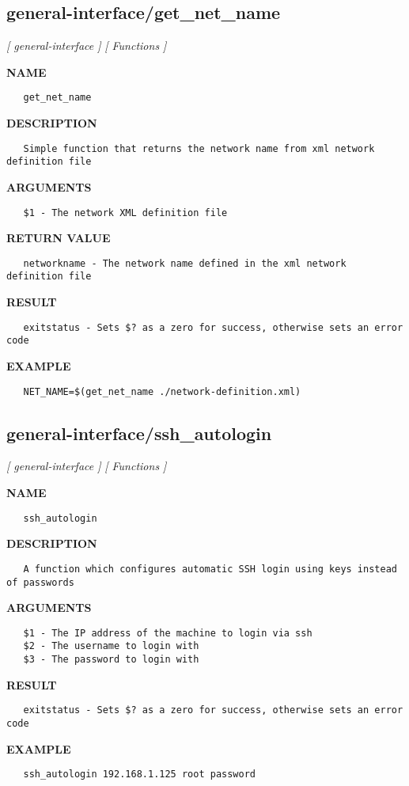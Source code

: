 \subsection{general-interface/get\_net\_name}
\textsl{[ general-interface ]}
\textsl{[ Functions ]}

\label{ch:robo26}
\label{ch:general_interface_get_net_name}
\textbf{NAME}
\begin{verbatim}
   get_net_name
\end{verbatim}
\textbf{DESCRIPTION}
\begin{verbatim}
   Simple function that returns the network name from xml network definition file
\end{verbatim}
\textbf{ARGUMENTS}
\begin{verbatim}
   $1 - The network XML definition file
\end{verbatim}
\textbf{RETURN VALUE}
\begin{verbatim}
   networkname - The network name defined in the xml network definition file
\end{verbatim}
\textbf{RESULT}
\begin{verbatim}
   exitstatus - Sets $? as a zero for success, otherwise sets an error code
\end{verbatim}
\textbf{EXAMPLE}
\begin{verbatim}
   NET_NAME=$(get_net_name ./network-definition.xml)
\end{verbatim}
\newpage
\subsection{general-interface/ssh\_autologin}
\textsl{[ general-interface ]}
\textsl{[ Functions ]}

\label{ch:robo27}
\label{ch:general_interface_ssh_autologin}
\textbf{NAME}
\begin{verbatim}
   ssh_autologin
\end{verbatim}
\textbf{DESCRIPTION}
\begin{verbatim}
   A function which configures automatic SSH login using keys instead of passwords
\end{verbatim}
\textbf{ARGUMENTS}
\begin{verbatim}
   $1 - The IP address of the machine to login via ssh
   $2 - The username to login with
   $3 - The password to login with
\end{verbatim}
\textbf{RESULT}
\begin{verbatim}
   exitstatus - Sets $? as a zero for success, otherwise sets an error code
\end{verbatim}
\textbf{EXAMPLE}
\begin{verbatim}
   ssh_autologin 192.168.1.125 root password
\end{verbatim}
\newpage
